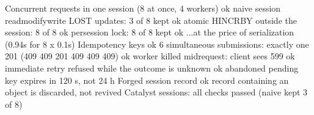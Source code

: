 Concurrent requests in one session (8 at once, 4 workers)
  ok  naive session read\PGZhy{}modify\PGZhy{}write LOST updates: 3 of 8 kept
  ok  atomic HINCRBY outside the session: 8 of 8
  ok  per\PGZhy{}session lock: 8 of 8 kept
  ok  ...at the price of serialization (0.94s for 8 x 0.1s)
Idempotency keys
  ok  6 simultaneous submissions: exactly one 201 (409 409 201 409 409 409)
  ok  worker killed mid\PGZhy{}request: client sees 599
  ok  immediate retry refused while the outcome is unknown
  ok  abandoned pending key expires in 120 s, not 24 h
Forged session record
  ok  record containing an object is discarded, not revived
Catalyst sessions: all checks passed (naive kept 3 of 8)
